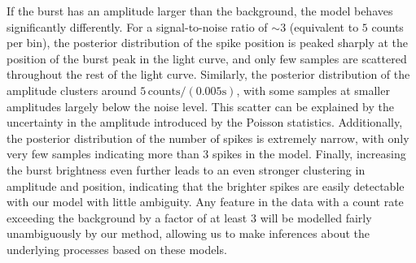 \documentclass[12pt]{emulateapj}
\begin{document}
If the burst has an amplitude larger than the background, the model behaves significantly differently. For a signal-to-noise ratio of $\sim 3$ (equivalent to $5$ counts per bin), 
the posterior distribution of the spike position is peaked sharply at the position of the burst peak in the light curve, 
and only few samples are scattered throughout the rest of the light curve. Similarly, the posterior distribution of the amplitude clusters 
around $5 \,\mathrm{counts}/(0.005\mathrm{s})$, with some samples at 
smaller amplitudes largely below the noise level. This scatter can be explained by the uncertainty in the amplitude introduced by the Poisson statistics. 
Additionally, the posterior distribution of the
number of spikes is extremely narrow, with only very few samples indicating more than $3$ spikes in the model. 
Finally, increasing the burst brightness even further leads to an even stronger clustering in amplitude and position, indicating that the brighter spikes are easily detectable with our model 
with little ambiguity. 
Any feature in the data with a count
rate exceeding the background by a factor of at least $3$ will be modelled fairly unambiguously by our method, allowing us to make inferences about the underlying processes based on these models. 
\end{document}
